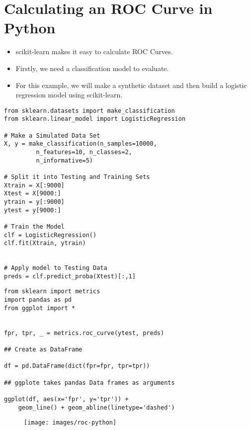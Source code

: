 \documentclass[SKL-MASTER.tex]{subfiles}
\begin{document}
	\Large
\section*{Calculating an ROC Curve in Python} 
\begin{itemize}
\item scikit-learn makes it easy to calculate ROC Curves. 
\item Firstly, we need a classification model to evaluate. 
\item For this example, we will make a synthetic dataset and then build a logistic regression model using scikit-learn.
\end{itemize}

{
	\Large
\begin{framed}
	\begin{verbatim}
from sklearn.datasets import make_classification
from sklearn.linear_model import LogisticRegression

# Make a Simulated Data Set
X, y = make_classification(n_samples=10000, 
         n_features=10, n_classes=2,
         n_informative=5)
         
# Split it into Testing and Training Sets         
Xtrain = X[:9000]
Xtest = X[9000:]
ytrain = y[:9000]
ytest = y[9000:]

# Train the Model
clf = LogisticRegression()
clf.fit(Xtrain, ytrain)


# Apply model to Testing Data
preds = clf.predict_proba(Xtest)[:,1]

\end{verbatim}
\end{framed}
}
%
\newpage
{
	\large
\begin{framed}
\begin{verbatim}
from sklearn import metrics
import pandas as pd
from ggplot import *


fpr, tpr, _ = metrics.roc_curve(ytest, preds)

## Create as DataFrame

df = pd.DataFrame(dict(fpr=fpr, tpr=tpr))

## ggplote takes pandas Data frames as arguments

ggplot(df, aes(x='fpr', y='tpr')) +
    geom_line() + geom_abline(linetype='dashed')

\end{verbatim}
\end{framed}
}
\begin{figure}[h!]
\centering
\texttt{[image: images/roc-python]}

\end{figure}
\end{document}
